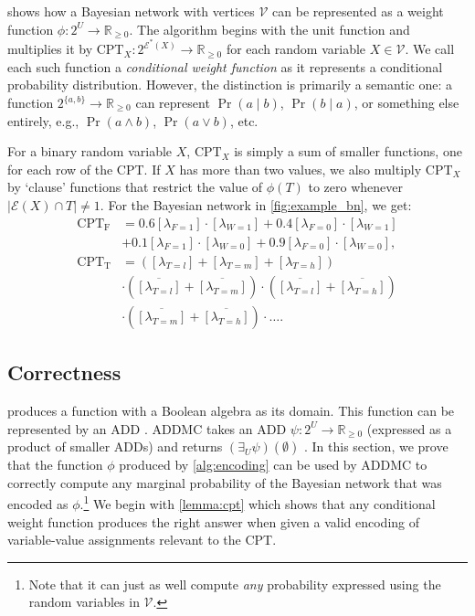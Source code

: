 \documentclass{uai2021} %
\theoremstyle{definition}
\begin{document}
 shows how a Bayesian network with vertices $\mathcal{V}$
can be represented as a weight function $\phi\colon 2^U \to \mathbb{R}_{\ge 0}$.
The algorithm begins with the unit function and multiplies it by
$\mathrm{CPT}_X\colon 2^{\mathcal{E}^*(X)} \to \mathbb{R}_{\ge 0}$ for each
random variable $X \in \mathcal{V}$. We call each such function a
\emph{conditional weight function} as it represents a conditional probability
distribution. However, the distinction is primarily a semantic one: a function
$2^{\{a, b\}} \to \mathbb{R}_{\ge 0}$ can represent $\Pr(a \mid b)$, $\Pr(b \mid
a)$, or something else entirely, e.g., $\Pr(a \land b)$, $\Pr(a \lor b)$, etc.

For a binary random variable $X$, $\mathrm{CPT}_X$ is simply a sum of smaller
functions, one for each row of the CPT. If $X$ has more than two values, we also
multiply $\mathrm{CPT}_X$ by `clause' functions that restrict the value of
$\phi(T)$ to zero whenever $|\mathcal{E}(X) \cap T| \ne 1$. For the Bayesian
network in \cref{fig:example_bn}, we get:
\begin{align*}
  \mathrm{CPT_F} &= 0.6[\lambda_{F=1}] \cdot [\lambda_{W=1}] + 0.4[\lambda_{F=0}] \cdot [\lambda_{W=1}] \\
                 &+ 0.1[\lambda_{F=1}] \cdot [\lambda_{W=0}] + 0.9[\lambda_{F=0}] \cdot [\lambda_{W=0}], \\
  \mathrm{CPT_T} &= ([\lambda_{T=l}] + [\lambda_{T=m}] + [\lambda_{T=h}]) \\
                 &\cdot (\overline{[\lambda_{T=l}]} + \overline{[\lambda_{T=m}]}) \cdot (\overline{[\lambda_{T=l}]} + \overline{[\lambda_{T=h}]}) \\
                 &\cdot (\overline{[\lambda_{T=m}]} + \overline{[\lambda_{T=h}]}) \cdot \dots.
\end{align*}

\subsection{Correctness}

 produces a function with a Boolean algebra as its domain.
This function can be represented by an ADD
\citep{DBLP:journals/fmsd/BaharFGHMPS97}. \textsf{ADDMC} takes an ADD
$\psi\colon 2^{U} \to \mathbb{R}_{\ge 0}$ (expressed as a product of smaller
ADDs) and returns $(\exists_U\psi)(\emptyset)$ \citep{DBLP:conf/aaai/DudekPV20}.
In this section, we prove that the function $\phi$ produced by
\cref{alg:encoding} can be used by \textsf{ADDMC} to correctly compute any
marginal probability of the Bayesian network that was encoded as
$\phi$.\footnote{Note that it can just as well compute \emph{any} probability
  expressed using the random variables in $\mathcal{V}$.} We begin with
\cref{lemma:cpt} which shows that any conditional weight function produces the
right answer when given a valid encoding of variable-value assignments relevant
to the CPT.
\end{document}
